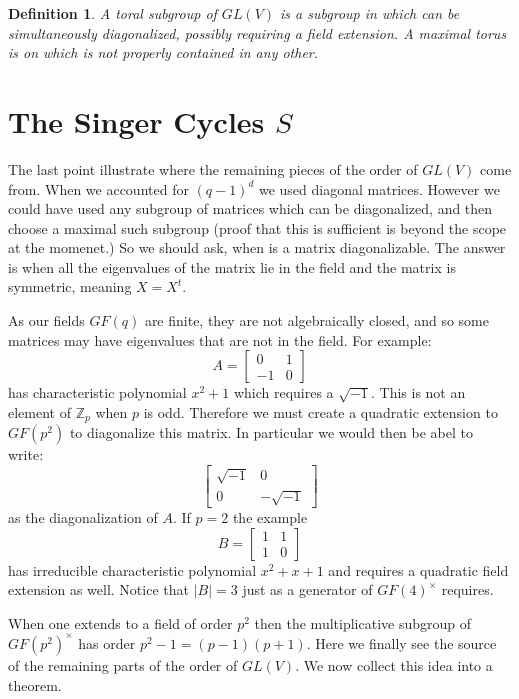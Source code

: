 \documentclass[12pt]{article}
\newtheorem{defn}[thm]{Definition}
\begin{document}
\begin{defn}
A toral subgroup of $GL(V)$ is a subgroup in which can be simultaneously
diagonalized, possibly requiring a field extension.  A maximal torus is on which is not properly contained in
any other.
\end{defn}

\section{The Singer Cycles $S$}

The last point illustrate where the remaining pieces of the order of $GL(V)$ come from.  When we accounted for $(q-1)^d$ we used diagonal matrices.  However we could have used any subgroup of matrices which can be diagonalized, and then choose a maximal such subgroup (proof that this is sufficient is beyond the scope at the momenet.)  So we should ask, when is a matrix diagonalizable.
The answer is when all the eigenvalues of the matrix lie in the field and the matrix is symmetric, meaning $X=X^t$.  

As our fields $GF(q)$ are finite, they are not algebraically closed, and so some matrices may have eigenvalues that are not in the field.  For example:
\[A=\begin{bmatrix} 0 & 1\\ -1 & 0\end{bmatrix}\]
has characteristic polynomial $x^2+1$ which requires a $\sqrt{-1}$.  This is not an element of $\mathbb{Z}_p$ when $p$ is odd.  Therefore we must create a quadratic extension to $GF(p^2)$ to diagonalize this matrix.  In particular we
would then be abel to write:
\[\begin{bmatrix} \sqrt{-1} & 0\\ 0 & -\sqrt{-1}\end{bmatrix}\]
as the diagonalization of $A$.  If $p=2$ the example
\[ B=\begin{bmatrix} 1 & 1\\ 1 & 0\end{bmatrix}\]
has irreducible characteristic polynomial $x^2+x+1$ and requires a quadratic field extension as well.  Notice that $|B|=3$ just as a generator of $GF(4)^\times$ requires.

When one extends to a field of order $p^2$ then the multiplicative subgroup of $GF(p^2)^\times$ has order $p^2-1=(p-1)(p+1)$.  Here we finally see the source of the remaining parts of the order of $GL(V)$.
We now collect this idea into a theorem.
\end{document}
